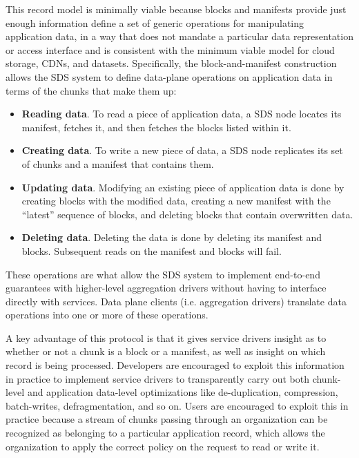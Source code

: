 This record model is minimally viable because blocks
and manifests provide just enough information define a
set of generic operations for manipulating application data, in a way that
does not mandate a particular data representation or access interface and is
consistent with the minimum viable model for cloud storage, CDNs, and datasets.
Specifically, the block-and-manifest construction allows
the SDS system to define data-plane operations on
application data in terms of the chunks that make them up:

\begin{itemize}
   \item \textbf{Reading data}.  To read a piece of application data, a SDS node locates
    its manifest, fetches it, and then fetches the blocks listed within it.

   \item \textbf{Creating data}.  To write a new piece of data, a SDS node replicates
    its set of chunks and a manifest that contains them.

   \item \textbf{Updating data}.  Modifying an existing
    piece of application data is done by creating blocks with the modified data,
    creating a new manifest with the ``latest'' sequence of blocks, and deleting
    blocks that contain overwritten data.

   \item \textbf{Deleting data}.  Deleting the data is done by
    deleting its manifest and blocks.  Subsequent reads on the manifest and
    blocks will fail.
\end{itemize}

These operations are what allow the SDS system to implement end-to-end
guarantees with higher-level aggregation drivers without having to interface
directly with services.  Data plane clients (i.e. aggregation drivers) translate data
operations into one or more of these operations.

A key advantage of this protocol is that it gives service drivers insight as to whether or not a
chunk is a block or a manifest, as well as insight on which 
record is being processed.  Developers are encouraged to exploit this
information in practice to implement
service drivers to transparently carry out both chunk-level and application
data-level optimizations like de-duplication, compression, batch-writes,
defragmentation, and so on.  Users are encouraged to exploit this in practice
because a stream of chunks passing through an organization can be recognized as
belonging to a particular application record, which allows the organization to
apply the correct policy on the request to read or write it.

